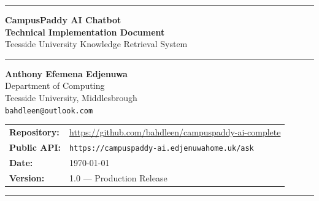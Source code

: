 \documentclass[12pt,a4paper]{report}
\begin{document}
\begin{titlepage}
\centering
\vspace*{1cm}

{\color{teesblue}\rule{\linewidth}{2pt}}
\vspace{0.5cm}

{\Huge\bfseries\color{teesblue} CampusPaddy AI Chatbot}\\[0.4cm]
{\Large\bfseries Technical Implementation Document}\\[0.3cm]
{\large Teesside University Knowledge Retrieval System}

\vspace{0.5cm}
{\color{teesblue}\rule{\linewidth}{2pt}}

\vspace{1.5cm}

{\Large\textbf{Anthony Efemena Edjenuwa}}\\[0.3cm]
{\normalsize Department of Computing}\\[0.1cm]
{\normalsize Teesside University, Middlesbrough}\\[0.1cm]
{\normalsize \texttt{bahdleen@outlook.com}}

\vspace{1.5cm}

\begin{tabular}{ll}
\textbf{Repository:} & \url{https://github.com/bahdleen/campuspaddy-ai-complete} \\[0.3cm]
\textbf{Public API:} & \texttt{https://campuspaddy-ai.edjenuwahome.uk/ask} \\[0.3cm]
\textbf{Date:}       & \today \\[0.3cm]
\textbf{Version:}    & 1.0 --- Production Release \\
\end{tabular}

\vspace{1.5cm}

\begin{abstract}
\setlength{\parindent}{0pt}
CampusPaddy is a production-ready, AI-powered question-answering chatbot built specifically for Teesside University students. It uses Retrieval-Augmented Generation (RAG) to deliver factually grounded answers drawn entirely from real university website content. The system was conceived in the author's second year of study and built through self-directed research into ethical web scraping, full-text search, local large language model (LLM) inference, and cloud database architecture. This document covers the complete technical journey: from idea and research, through data collection on a dedicated scraper server, text chunking and migration to Neon cloud PostgreSQL, to the final deployed REST API running behind a Cloudflare Tunnel with a 7.5$\times$ caching speedup. The knowledge base comprises 25,345 text chunks extracted from 11,753 Teesside University web pages, PDFs, and Word documents.
\end{abstract}

\vfill
{\color{teesblue}\rule{\linewidth}{1pt}}
\end{titlepage}
\end{document}

